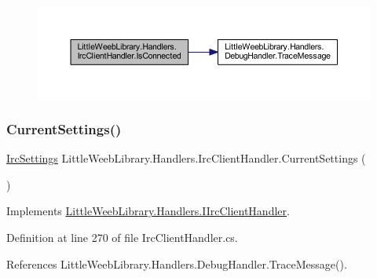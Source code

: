 \begin{figure}[H]
\begin{center}
\leavevmode
\includegraphics[width=350pt]{class_little_weeb_library_1_1_handlers_1_1_irc_client_handler_a2cc2c26c57a1c94f209ca8641c9e25ef_cgraph}
\end{center}
\end{figure}
\mbox{\label{class_little_weeb_library_1_1_handlers_1_1_irc_client_handler_aa15fe2f3c1bd99a513400b0880298edd}} 
\subsubsection{\texorpdfstring{Current\+Settings()}{CurrentSettings()}}
{\footnotesize\ttfamily \mbox{\hyperlink{class_little_weeb_library_1_1_settings_1_1_irc_settings}{Irc\+Settings}} Little\+Weeb\+Library.\+Handlers.\+Irc\+Client\+Handler.\+Current\+Settings (\begin{DoxyParamCaption}{ }\end{DoxyParamCaption})}



Implements \mbox{\hyperlink{interface_little_weeb_library_1_1_handlers_1_1_i_irc_client_handler_af27269f6df01227345fc51030e702b51}{Little\+Weeb\+Library.\+Handlers.\+I\+Irc\+Client\+Handler}}.



Definition at line 270 of file Irc\+Client\+Handler.\+cs.



References Little\+Weeb\+Library.\+Handlers.\+Debug\+Handler.\+Trace\+Message().


